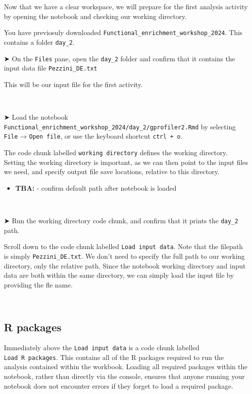 \documentclass[
]{book}
\providecommand{\tightlist}{%
  \setlength{\itemsep}{0pt}\setlength{\parskip}{0pt}}
\begin{document}
Now that we have a clear workspace, we will prepare for the first analysis activity by opening the notebook and checking our working directory.

You have previosuly downloaded \texttt{Functional\_enrichment\_workshop\_2024}. This contains a folder \texttt{day\_2}.

➤ On the \texttt{Files} pane, open the \texttt{day\_2} folder and confirm that it contains the input data file \texttt{Pezzini\_DE.txt}

This will be our input file for the first activity.

~

➤ Load the notebook \texttt{Functional\_enrichment\_workshop\_2024/day\_2/gprofiler2.Rmd} by selecting \texttt{File} → \texttt{Open\ file}, or use the keyboard shortcut \texttt{ctrl\ +\ o}.

The code chunk labelled \texttt{working\ directory} defines the working directory. Setting the working directory is important, as we can then point to the input files we need, and specify output file save locations, relative to this directory.

\begin{itemize}
\tightlist
\item
  \textbf{TBA:} - confirm default path after notebook is loaded
\end{itemize}

~

➤ Run the working directory code chunk, and confirm that it prints the \texttt{day\_2} path.

Scroll down to the code chunk labelled \texttt{Load\ input\ data}. Note that the filepath is simply \texttt{Pezzini\_DE.txt}. We don't need to specify the full path to our working directory, only the relative path. Since the notebook working directory and input data are both within the same directory, we can simply load the input file by providing the fle name.

~

\hypertarget{r-packages}{%
\subsection{R packages}\label{r-packages}}

Immediately above the \texttt{Load\ input\ data} is a code chunk labelled \texttt{Load\ R\ packages}. This contains all of the R packages required to run the analysis contained within the workbook. Loading all required packages within the notebook, rather than directly via the console, ensures that anyone running your notebook does not encounter errors if they forget to load a required package.
\end{document}
